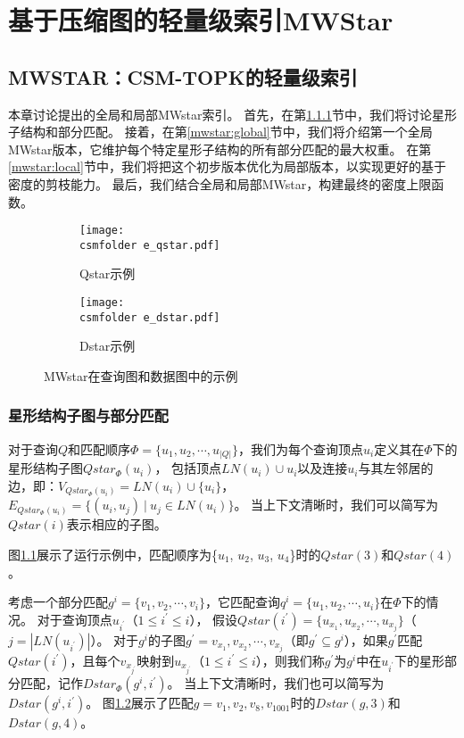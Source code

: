 \chapter{基于压缩图的轻量级索引MWStar}
\section{MWSTAR：CSM-TOPK的轻量级索引}
本章讨论提出的全局和局部MWstar索引。
首先，在第\ref{mwstar:star_subquery}节中，我们将讨论星形子结构和部分匹配。
接着，在第\ref{mwstar:global}节中，我们将介绍第一个全局MWstar版本，它维护每个特定星形子结构的所有部分匹配的最大权重。
在第\ref{mwstar:local}节中，我们将把这个初步版本优化为局部版本，以实现更好的基于密度的剪枝能力。
最后，我们结合全局和局部MWstar，构建最终的密度上限函数。

\begin{figure}[h!]
\def\wscorevone{0.48}
\centering
\begin{subfigure}[t]{\wscorevone\linewidth}
\centering
\resizebox{\linewidth}{!}
{
\texttt{[image: \\csmfolder e\_qstar.pdf]}
}
\caption{Qstar示例}
\label{fig:qstar}
\end{subfigure}
\begin{subfigure}[t]{\wscorevone\linewidth}
\centering
\resizebox{\linewidth}{!}
{
\texttt{[image: \\csmfolder e\_dstar.pdf]}
}
\caption{Dstar示例}
\label{fig:dstar}
\end{subfigure}
\caption{MWstar在查询图和数据图中的示例}
\label{fig:exp:mwstar}
\end{figure}

\subsection{星形结构子图与部分匹配}
\label{mwstar:star_subquery}

\begin{definition}[星形结构子图]\label{def:star-subquery}
对于查询$Q$和匹配顺序$\Phi=\{u_1, u_2, \cdots, u_{|Q|} \}$，我们为每个查询顶点$u_i$定义其在$\Phi$下的星形结构子图$Qstar_{\Phi}(u_i)$，
包括顶点$LN(u_i) \cup {u_i}$以及连接$u_i$与其左邻居的边，即：$V_{Qstar_{\Phi}(u_i)} = LN(u_i) \cup \{u_i\}$，$E_{Qstar_{\Phi}(u_i)} = \{(u_i, u_j)\ |\ u_j\in LN(u_i)\}$。
当上下文清晰时，我们可以简写为$Qstar(i)$表示相应的子图。
\end{definition}

图\ref{fig:qstar}展示了运行示例中，匹配顺序为\{$u_1$, $u_2$, $u_3$, $u_4$\}时的$Qstar(3)$和$Qstar(4)$。

考虑一个部分匹配$g^i=\{v_1, v_2, \cdots, v_i\}$，它匹配查询$q^i=\{u_1, u_2, \cdots, u_{i}\}$在$\Phi$下的情况。
对于查询顶点$u_{i^\prime}$（$1 \leq i^\prime \leq i$），
假设$Qstar(i^\prime) = \{u_{x_1}, u_{x_2}, \cdots, u_{x_j}\}$（$j = |LN(u_{i^\prime})|$）。
对于$g^i$的子图$g^\prime = {v_{x_1}, v_{x_2}, \cdots, v_{x_j}}$（即$g^\prime \subseteq g^i$），如果$g^\prime$匹配$Qstar(i^\prime)$，且每个$v_{x_{j^\prime}}$映射到$u_{x_{j^\prime}}$（$1 \leq i^\prime \leq i$），则我们称$g^\prime$为$g^i$中在$u_{i^\prime}$下的星形部分匹配，记作$Dstar_{\Phi}(g^i, i^\prime)$。
当上下文清晰时，我们也可以简写为$Dstar(g^i, i^\prime)$。
图\ref{fig:dstar}展示了匹配$g={v_1, v_2, v_8, v_{1001}}$时的$Dstar(g, 3)$和$Dstar(g, 4)$。

